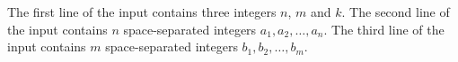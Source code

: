 The first line of the input contains three integers $n$, $m$ and $k$.
The second line of the input contains $n$ space-separated integers $a_1,a_2,\ldots,a_n$.
The third line of the input contains $m$ space-separated integers $b_1,b_2,\ldots,b_m$.